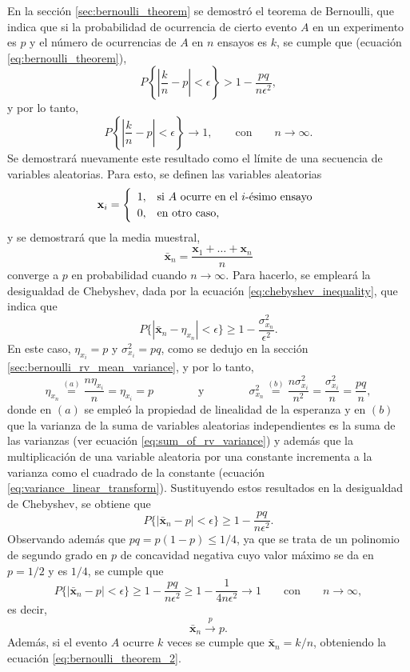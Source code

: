\documentclass[a4paper]{report}
\newcommand{\x}{\mathbf{x}}
\begin{document}
En la sección \ref{sec:bernoulli_theorem} se demostró el teorema de Bernoulli, que indica que si la probabilidad de ocurrencia de cierto evento \(A\) en un experimento es \(p\) y el número de ocurrencias de \(A\) en \(n\) ensayos es \(k\), se cumple que (ecuación \ref{eq:bernoulli_theorem}),
\[
 P\left\{\left|\frac{k}{n}-p\right|<\epsilon\right\}>1-\frac{pq}{n\epsilon^2},
\]
y por lo tanto,
\begin{equation}\label{eq:bernoulli_theorem_2}
 P\left\{\left|\frac{k}{n}-p\right|<\epsilon\right\}\to1,\qquad\textrm{con}\qquad n\to\infty.
\end{equation}
Se demostrará nuevamente este resultado como el límite de una secuencia de variables aleatorias. Para esto, se definen las variables aleatorias
\[\def\arraystretch{1.2}
 \x_i=
 \left\{\begin{array}{ll}
  1, &  \textrm{si }A\textrm{ ocurre en el }i\textrm{-ésimo ensayo}\\
  0, &  \textrm{en otro caso},
 \end{array}\right.
\]
y se demostrará que la media muestral,
\[
 \bar{\x}_n=\frac{\x_1+\dots+\x_n}{n}
\]
converge a \(p\) en probabilidad cuando \(n\to\infty\). Para hacerlo, se empleará la desigualdad de Chebyshev, dada por la ecuación \ref{eq:chebyshev_inequality}, que indica que
\[
 P\{|\bar{\x}_n-\eta_{x_n}|<\epsilon\}\geq 1-\frac{\sigma^2_{x_n}}{\epsilon^2}.
\]
En este caso, \(\eta_{x_i}=p\) y \(\sigma^2_{x_i}=pq\), como se dedujo en la sección \ref{sec:bernoulli_rv_mean_variance}, y por lo tanto,
\[
 \eta_{x_n}\overset{(a)}{=}\frac{n\eta_{x_i}}{n}=\eta_{x_i}=p\qquad\qquad\textrm{y}\qquad\qquad
 \sigma^2_{x_n}\overset{(b)}{=}\frac{n\sigma^2_{x_i}}{n^2}=\frac{\sigma^2_{x_i}}{n}=\frac{pq}{n},
\]
donde en \((a)\) se empleó la propiedad de linealidad de la esperanza y en \((b)\) que la varianza de la suma de variables aleatorias independientes es la suma de las varianzas (ver ecuación \ref{eq:sum_of_rv_variance}) y además que la multiplicación de una variable aleatoria por una constante incrementa a la varianza como el cuadrado de la constante (ecuación \ref{eq:variance_linear_transform}). Sustituyendo estos resultados en la desigualdad de Chebyshev, se obtiene que
\[
 P\{|\bar{\x}_n-p|<\epsilon\}\geq 1-\frac{pq}{n\epsilon^2}.
\]
Observando además que \(pq=p(1-p)\leq1/4\), ya que se trata de un polinomio de segundo grado en \(p\) de concavidad negativa cuyo valor máximo se da en \(p=1/2\) y es \(1/4\), se cumple que
\[
 P\{|\bar{\x}_n-p|<\epsilon\}\geq 1-\frac{pq}{n\epsilon^2}\geq1-\frac{1}{4n\epsilon^2}\to1\qquad\textrm{con}\qquad n\to\infty,
\]
es decir,
\[
 \bar{\x}_n\overset{p}{\longrightarrow}p.
\]
Además, si el evento \(A\) ocurre \(k\) veces se cumple que \(\bar{\x}_n=k/n\), obteniendo la ecuación \ref{eq:bernoulli_theorem_2}.
\end{document}
